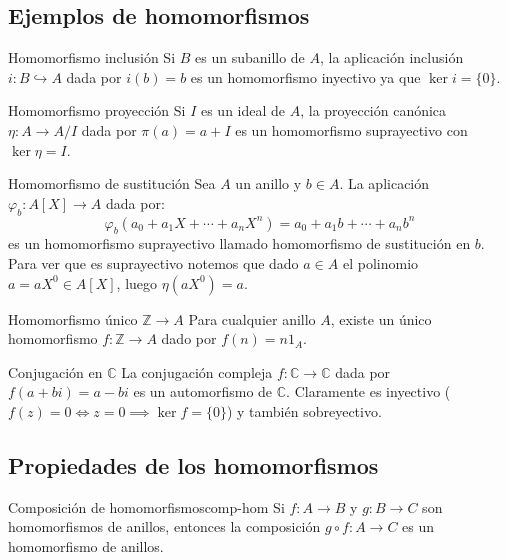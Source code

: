 \subsection{Ejemplos de homomorfismos}

\begin{example}{Homomorfismo inclusión}{}
    Si \(B\) es un subanillo de \(A\), la aplicación inclusión \(i: B \hookrightarrow A\) dada por \(i(b) = b\) es un homomorfismo inyectivo ya que $\ker i = \{0\}$.
\end{example}


\begin{example}{Homomorfismo proyección}{}
    Si \(I\) es un ideal de \(A\), la proyección canónica \(\eta: A \to A/I\) dada por \(\pi(a) = a + I\) es un homomorfismo suprayectivo con \(\ker \eta = I\).
\end{example}

\begin{example}{Homomorfismo de sustitución}{}
    Sea \(A\) un anillo y \(b \in A\). La aplicación \(\varphi_b: A[X] \to A\) dada por:
    \[
    \varphi_b(a_0 + a_1X + \cdots + a_nX^n) = a_0 + a_1b + \cdots + a_nb^n
    \]
    es un homomorfismo suprayectivo llamado homomorfismo de sustitución en \(b\). Para ver que es suprayectivo notemos que dado $a \in A$ el polinomio $a = aX^0 \in A[X]$, luego $\eta(aX^0) = a$.
\end{example}

\begin{example}{Homomorfismo único \(\mathbb{Z} \to A\)}{}
    Para cualquier anillo \(A\), existe un único homomorfismo \(f: \mathbb{Z} \to A\) dado por \(f(n) = n 1_A\).
\end{example}

\begin{example}{Conjugación en \(\mathbb{C}\)}{}
    La conjugación compleja \(f: \mathbb{C} \to \mathbb{C}\) dada por \(f(a + bi) = a - bi\) es un automorfismo de \(\mathbb{C}\). Claramente es inyectivo ($f(z) = 0 \iff z = 0 \implies \ker f = \{0\}$) y también sobreyectivo.
\end{example}

\subsection{Propiedades de los homomorfismos}


\begin{proposition}{Composición de homomorfismos}{comp-hom}
    Si \(f: A \to B\) y \(g: B \to C\) son homomorfismos de anillos, entonces la composición \(g \circ f: A \to C\) es un homomorfismo de anillos.
\end{proposition}

